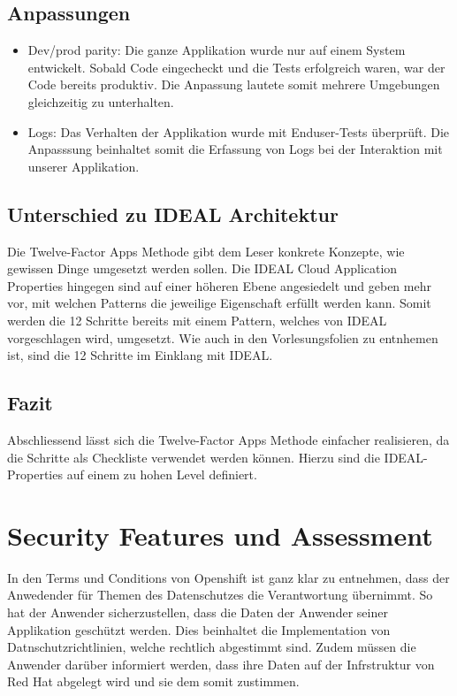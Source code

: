\documentclass[12pt,a4paper]{article}
\begin{document}
\subsection{Anpassungen}
    \begin{itemize}
        \item Dev/prod parity: Die ganze Applikation wurde nur auf einem System entwickelt. Sobald Code eingecheckt und die Tests
              erfolgreich waren, war der Code bereits produktiv. Die Anpassung lautete somit mehrere Umgebungen gleichzeitig zu
              unterhalten.
        \item Logs: Das Verhalten der Applikation wurde mit Enduser-Tests überprüft. Die Anpasssung beinhaltet somit die Erfassung
              von Logs bei der Interaktion mit unserer Applikation.
    \end{itemize}

\subsection{Unterschied zu IDEAL Architektur}

Die Twelve-Factor Apps Methode gibt dem Leser konkrete Konzepte, wie gewissen Dinge umgesetzt werden sollen. Die IDEAL Cloud Application
Properties hingegen sind auf einer höheren Ebene angesiedelt und geben mehr vor, mit welchen Patterns die jeweilige Eigenschaft erfüllt werden kann.
Somit werden die 12 Schritte bereits mit einem Pattern, welches von IDEAL vorgeschlagen wird, umgesetzt. Wie auch in den Vorlesungsfolien zu entnhemen ist,
sind die 12 Schritte im Einklang mit IDEAL.

\subsection{Fazit}
Abschliessend lässt sich die Twelve-Factor Apps Methode einfacher realisieren, da die Schritte als Checkliste verwendet werden können.
Hierzu sind die IDEAL-Properties auf einem zu hohen Level definiert.

\section{Security Features und Assessment}

In den Terms und Conditions von Openshift ist ganz klar zu entnehmen, dass der Anwedender für Themen des Datenschutzes die Verantwortung übernimmt.
So hat der Anwender sicherzustellen, dass die Daten der Anwender seiner Applikation geschützt werden. Dies beinhaltet die Implementation von
Datnschutzrichtlinien, welche rechtlich abgestimmt sind. Zudem müssen die Anwender darüber informiert werden, dass ihre Daten auf der Infrstruktur
von Red Hat abgelegt wird und sie dem somit zustimmen.
\end{document}
